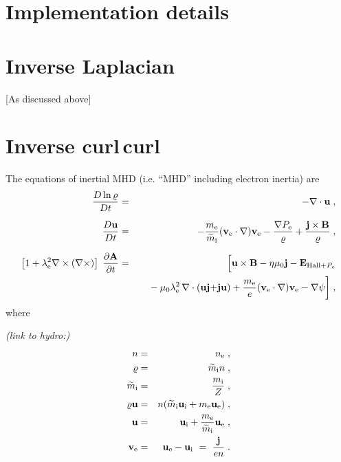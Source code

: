 \documentclass[\mydriver,12pt,twoside,notitlepage,letterpaper]{article}
\newcommand{\Av}      {\mathbf{A}}
\newcommand{\Bv}      {\mathbf{B}}
\newcommand{\Ev}      {\mathbf{E}}
\newcommand{\jv}      {\mathbf{j}}
\newcommand{\mtildei} {\widetilde{m}_{\rm i}}
\newcommand{\uv}      {\mathbf{u}}
\newcommand{\uve}     {\uv_{\rm e}}
\newcommand{\uvi}     {\uv_{\rm i}}
\newcommand{\vv}      {\mathbf{v}}
\newcommand{\vve}     {\vv_{\rm e}}
\begin{document}
\section{Implementation details}


\section{Inverse Laplacian}

[As discussed above]


\section{Inverse curl\,curl}

The equations of inertial MHD (i.e. ``MHD'' including electron inertia)
are
\begin{eqnarray}
  \dfrac{D\ln\varrho}{Dt}
  &=& - \nabla\cdot\uv \; , \\[1.5ex]
  \dfrac{D\uv}{Dt}
  &=& - \dfrac{m_{\rm e}}
              {\mtildei}
        (\vve\cdot\nabla)\vve
      - \dfrac{\nabla P_{\rm e}}
              {\varrho}
      + \dfrac{\jv \times \Bv}
              {\varrho} \; , \\[1.5ex]
  \left[ 1 +\lambda_{\rm e}^2 \nabla\times (\nabla\times)
  \right] \;
  \dfrac{\partial \Av}{\partial t}
  &=& \Bigl[ \uv\times\Bv
             - \eta\mu_0\jv
             - \Ev_{\rm Hall+\mathit{P}_e} \nonumber \\
  & &        \quad{}
             - \mu_0 \lambda_{\rm e}^2\, \nabla\cdot(\uv\jv {+} \jv\uv)
             + \dfrac{m_{\rm e}}{e} (\vve\cdot\nabla)\vve
             - \nabla\psi
      \biggr] \; ,
\end{eqnarray}
%
where

\emph{(link to hydro:)}
\begin{eqnarray}
  n                &=& n_{\rm e} \; , \\
  \varrho          &=& \mtildei n \; , \\
  \mtildei         &=& \dfrac{m_{\rm i}}{Z} \; , \\
  \varrho\uv       &=& n ( \mtildei \uvi + m_{\rm e} \uve ) \; , \\
  \uv              &=& \uvi + \dfrac{m_{\rm e}}{\mtildei} \uve \; , \\
  \vve             &=& \uv_{\rm e} - \uv_{\rm i}
                       \ = \ \dfrac{\jv}{en} \; .
\end{eqnarray}
\end{document}
